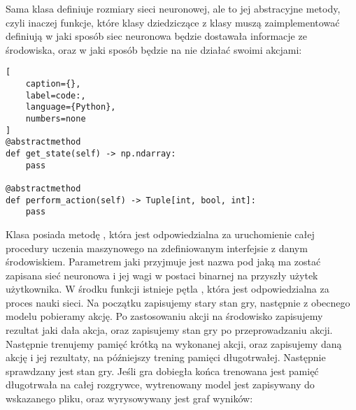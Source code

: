 Sama klasa definiuje rozmiary sieci neuronowej, ale to jej abstracyjne metody, czyli inaczej funkcje, które klasy dziedziczące z klasy  muszą zaimplementować definiują w jaki sposób siec neuronowa będzie dostawała informacje ze środowiska, oraz w jaki sposób będzie na nie działać swoimi akcjami:

\begin{onepage}
    \begin{lstlisting}[
    caption={},
    label=code:,
    language={Python},
    numbers=none
]
@abstractmethod
def get_state(self) -> np.ndarray:
    pass

@abstractmethod
def perform_action(self) -> Tuple[int, bool, int]:
    pass
\end{lstlisting}
\end{onepage}

Klasa  posiada metodę , która jest odpowiedzialna za uruchomienie całej procedury uczenia maszynowego na zdefiniowanym interfejsie z danym środowiskiem. Parametrem jaki przyjmuje jest nazwa pod jaką ma zostać zapisana sieć neuronowa i jej wagi w postaci binarnej na przyszły użytek użytkownika. W środku funkcji istnieje pętla , która jest odpowiedzialna za proces nauki sieci. Na początku zapisujemy stary stan gry, następnie z obecnego modelu pobieramy akcję. Po zastosowaniu akcji na środowisko zapisujemy rezultat jaki dała akcja, oraz zapisujemy stan gry po przeprowadzaniu akcji. Następnie trenujemy pamięć krótką na wykonanej akcji, oraz zapisujemy daną akcję i jej rezultaty, na późniejszy trening pamięci długotrwałej. Następnie sprawdzany jest stan gry. Jeśli gra dobiegła końca trenowana jest pamięć długotrwała na całej rozgrywce, wytrenowany model jest zapisywany do wskazanego pliku, oraz wyrysowywany jest graf wyników:


